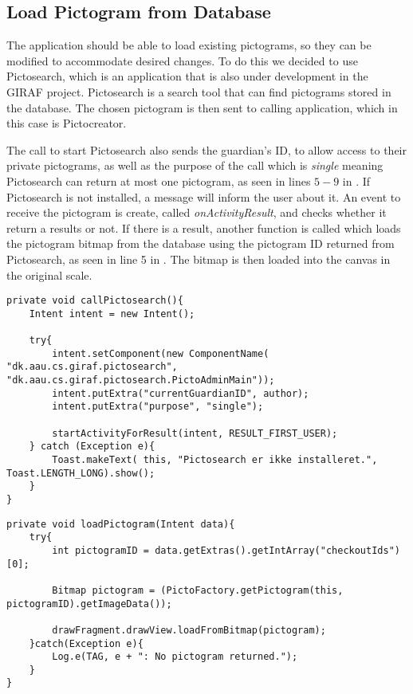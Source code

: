 \subsection{Load Pictogram from Database}
The application should be able to load existing pictograms, so they can be modified to accommodate desired changes.
To do this we decided to use Pictosearch, which is an application that is also under development in the GIRAF project.
Pictosearch is a search tool that can find pictograms stored in the database.
The chosen pictogram is then sent to calling application, which in this case is Pictocreator.

The call to start Pictosearch also sends the guardian's ID, to allow access to their private pictograms, as well as the purpose of the call which is \textit{single} meaning Pictosearch can return at most one pictogram, as seen in lines $5-9$ in .
If Pictosearch is not installed, a message will inform the user about it.
An event to receive the pictogram is create, called \textit{onActivityResult}, and checks whether it return a results or not.
If there is a result, another function is called which loads the pictogram bitmap from the database using the pictogram ID returned from Pictosearch, as seen in line 5 in  .
The bitmap is then loaded into the canvas in the original scale.

\begin{lstlisting}[caption=Method used to launch Pictosearch., label=lst:callPictosearch]
private void callPictosearch(){
    Intent intent = new Intent();

    try{
        intent.setComponent(new ComponentName( "dk.aau.cs.giraf.pictosearch",  "dk.aau.cs.giraf.pictosearch.PictoAdminMain"));
        intent.putExtra("currentGuardianID", author);
        intent.putExtra("purpose", "single");

        startActivityForResult(intent, RESULT_FIRST_USER);
    } catch (Exception e){
        Toast.makeText( this, "Pictosearch er ikke installeret.", Toast.LENGTH_LONG).show();
    }
}
\end{lstlisting}

\begin{lstlisting}[caption=Method to load a pictogram from Id received from Pictosearch, label=lst:loadPictogram]
private void loadPictogram(Intent data){
    try{
        int pictogramID = data.getExtras().getIntArray("checkoutIds")[0];

        Bitmap pictogram = (PictoFactory.getPictogram(this, pictogramID).getImageData());

        drawFragment.drawView.loadFromBitmap(pictogram);
    }catch(Exception e){
        Log.e(TAG, e + ": No pictogram returned.");
    }
}
\end{lstlisting}